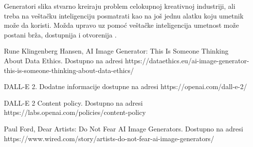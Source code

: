 \documentclass[12pt, letterpaper]{article}
\begin{document}
Generatori slika stvarno kreiraju problem celokupnoj kreativnoj industriji, ali treba na veštačku inteligenciju posmatrati kao na još jednu alatku koju umetnik može da koristi. Možda upravo uz pomoć veštačke inteligencija umetnost može postani brža, dostupnija i otvorenija \cite{fear}.

\pagebreak
\begin{thebibliography}{10}

 Rune Klingenberg Hansen, AI Image Generator: This Is Someone Thinking About Data Ethics. Dostupno na adresi https://dataethics.eu/ai-image-generator-this-is-someone-thinking-about-data-ethics/

 DALL-E 2. Dodatne informacije dostupne na adresi https://openai.com/dall-e-2/

 DALL-E 2 Content policy. Dostupno na adresi https://labs.openai.com/policies/content-policy

 Paul Ford, Dear Artists: Do Not Fear AI Image Generators. Dostupno na adresi https://www.wired.com/story/artists-do-not-fear-ai-image-generators/

\end{thebibliography}
\end{document}
